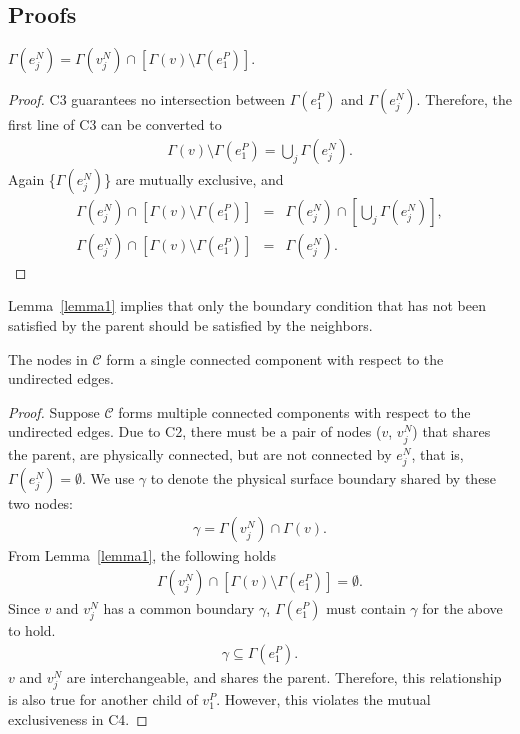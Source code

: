 \subsection{Proofs}

\begin{lemma}\label{lemma1}
$\Gamma(e^N_j) = \Gamma(v^N_j) \cap \left[\Gamma(v) \setminus
                                     \Gamma(e^P_1)\right]$.
\end{lemma}

\begin{proof}
C3 guarantees no intersection between $\Gamma(e^P_1)$ and
 $\Gamma(e^N_j)$. Therefore, the first line of C3 can be converted to
\begin{eqnarray*}
 \Gamma(v) \setminus \Gamma(e^P_1) = \bigcup_j \Gamma(e^N_j).
\end{eqnarray*}
Again \{$\Gamma(e^N_j)$\} are mutually exclusive, and
\begin{eqnarray*}
 \Gamma(e^N_j)\cap \left[\Gamma(v) \setminus \Gamma(e^P_1)\right] &=&  \Gamma(e^N_j)\cap
  \left[\bigcup_j \Gamma(e^N_j)\right], \nonumber \\
 \Gamma(e^N_j)\cap \left[\Gamma(v) \setminus \Gamma(e^P_1)\right] &=&  \Gamma(e^N_j).\nonumber
 \end{eqnarray*}
\end{proof}
 
Lemma~\ref{lemma1} implies that only the boundary condition that has not
been satisfied by the parent should be satisfied by the neighbors.

\begin{lemma}\label{lemma2}
The nodes in $\mathcal{C}$ form a single connected component with respect
to the undirected edges.
\end{lemma}
 
\begin{proof}
Suppose $\mathcal{C}$ forms multiple connected components with respect
to the undirected edges. Due to C2, there must be a pair of nodes ($v$,
$v^N_j$) that shares the parent, are physically connected, but are not
connected by $e^N_j$, that is, $\Gamma(e^N_j) = \emptyset$. We use
$\gamma$ to denote the physical surface boundary shared by these two
nodes:
\begin{eqnarray*}
 \gamma = \Gamma(v^N_j) \cap \Gamma(v).
\end{eqnarray*}
From Lemma~\ref{lemma1}, the following holds
\begin{eqnarray*}
 \Gamma(v^N_j) \cap \left[\Gamma(v) \setminus
                     \Gamma(e^P_1)\right] = \emptyset.
\end{eqnarray*}
Since $v$ and $v^N_j$ has a common boundary $\gamma$, $\Gamma(e^P_1)$
 must contain $\gamma$ for the above to hold.
 \begin{eqnarray*}
 \gamma \subseteq \Gamma(e^P_1).
\end{eqnarray*}
% 
$v$ and $v^N_j$ are interchangeable, and shares the parent. Therefore,
this relationship is also true for another child of $v^P_1$.
However, this violates the mutual exclusiveness in C4.
\end{proof}

